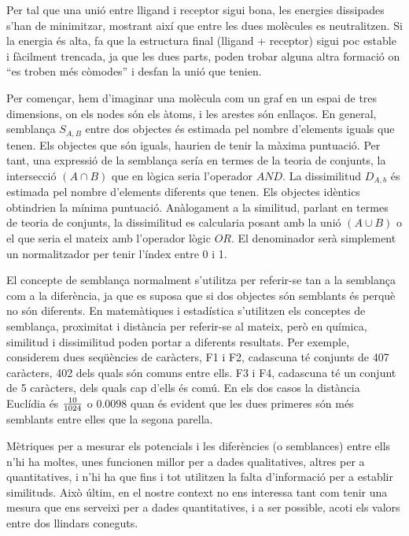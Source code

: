 Per tal que una unió entre lligand i receptor sigui bona, les energies
dissipades s'han de minimitzar, mostrant així que entre les dues molècules es
neutralitzen.  Si la energia és alta, fa que la estructura final (lligand +
receptor) sigui poc estable i fàcilment trencada, ja que les dues parts, poden
trobar alguna altra formació on ``es troben més còmodes'' i desfan la unió que
tenien.


Per començar, hem d'imaginar una molècula com un graf en un espai de tres
dimensions, on els nodes són els àtoms, i les arestes són enllaços.  En general,
semblança $S_{A,B}$ entre dos objectes és estimada pel nombre d'elements iguals
que tenen. Els objectes que són iguals, haurien de tenir la màxima puntuació.
Per tant, una expressió de la semblança sería en termes de la teoria de
conjunts, la intersecció $(A\cap B)$ que en lògica seria l'operador $AND$. La
dissimilitud $D_{A,b}$ és estimada pel nombre d'elements diferents que tenen.
Els objectes idèntics obtindrien la mínima puntuació. Anàlogament a la
similitud, parlant en termes de teoria de conjunts, la dissimilitud es
calcularia posant amb la unió $(A\cup B)$ o el que seria el mateix amb
l'operador lògic $OR$. El denominador serà simplement un normalitzador per tenir
l'índex entre 0 i 1. 

El concepte de semblança normalment s'utilitza per referir-se tan a la semblança
com a la diferència, ja que es suposa que si dos objectes són semblants és
perquè no són diferents. En matemàtiques i estadística s'utilitzen els conceptes
de semblança, proximitat i distància per referir-se al mateix, però en química,
similitud i dissimilitud poden portar a diferents resultats. Per exemple,
considerem dues seqüències de caràcters, F1 i F2, cadascuna té conjunts de 407
caràcters, 402 dels quals són comuns entre ells. F3 i F4, cadascuna té un
conjunt de 5 caràcters, dels quals cap d'ells és comú. En els dos casos la
distància Euclídia és $10 \over 1024$  o $0.0098$ quan és evident que les dues
primeres són més semblants entre elles que la segona parella.


Mètriques per a mesurar els potencials i les diferències (o semblances) entre
ells n'hi ha moltes, unes funcionen millor per a dades qualitatives, altres per
a quantitatives, i n'hi ha que fins i tot utilitzen la falta d'informació per a
establir similituds.  Això últim, en el nostre context no ens interessa tant com
tenir una mesura que ens serveixi per a dades quantitatives, i a ser possible,
acoti els valors entre dos llindars coneguts.

